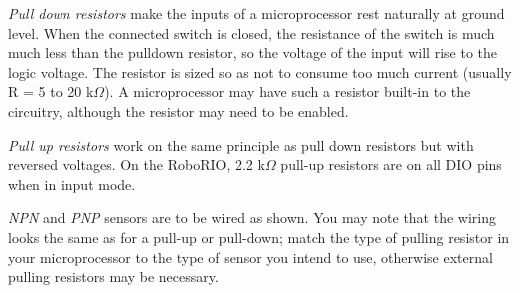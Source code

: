 \begin{asparaenum}[a)]
\item \textit{Pull down resistors} make the inputs of a microprocessor rest naturally at ground level. When the connected switch is closed, the resistance of the switch is much much less than the pulldown resistor, so the voltage of the input will rise to the logic voltage. The resistor is sized so as not to consume too much current (usually R = 5 to 20 k$\Omega$). A microprocessor may have such a resistor built-in to the circuitry, although the resistor may need to be enabled.
\item \textit{Pull up resistors} work on the same principle as pull down resistors but with reversed voltages. On the RoboRIO, 2.2 k$\Omega$ pull-up resistors are on all DIO pins when in input mode.
\item \textit{NPN} and \textit{PNP} sensors are to be wired as shown. You may note that the wiring looks the same as for a pull-up or pull-down; match the type of pulling resistor in your microprocessor to the type of sensor you intend to use, otherwise external pulling resistors may be necessary.
\end{asparaenum}




